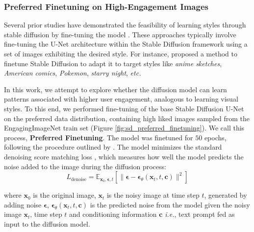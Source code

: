  

 
 
 \subsubsection{Preferred Finetuning on High-Engagement Images}
 \label{sec:Finetuning Stable Diffusion on High-KPI Images}
 
 Several prior studies have demonstrated the feasibility of learning styles through stable diffusion by fine-tuning the model \cite{pinkney2022text-to-pokemon,cjwbw2022waifudiffusion,prompthero2023openjourneyv2,everaert2023diffusion}. These approaches typically involve fine-tuning the U-Net architecture within the Stable Diffusion framework using a set of images exhibiting the desired style.
 For instance, \citet{everaert2023diffusion} proposed a method to finetune Stable Diffusion to adapt it to target styles like \textit{anime sketches}, \textit{American comics}, \textit{Pokemon}, \textit{starry night}, \textit{etc.}
 
 In this work, we attempt to explore whether the diffusion model can learn patterns associated with higher user engagement, analogous to learning visual styles. To this end, we performed fine-tuning of the base Stable Diffusion U-Net on the preferred data distribution, containing high liked images sampled from the EngagingImageNet train set (Figure \ref{fig:sd_preferred_finetuning}). We call this process, \textbf{Preferred Finetuning}. The model was finetuned for $50$ epochs, following the procedure outlined by \citet{vonplaten2023stablediffusion}. The model minimizes the standard denoising score matching loss \cite{ho2020denoising, ho2022classifier}, which measures how well the model predicts the noise added to the image during the diffusion process:
\begin{equation}
    L_{\text{denoise}} = \mathbb{E}_{\mathbf{x}_0, \boldsymbol{\epsilon}, t} \left[ \|\boldsymbol{\epsilon} - \boldsymbol{\epsilon}_{\theta}(\mathbf{x}_t, t, \mathbf{c})\|^2 \right]
\end{equation}


where $\mathbf{x}_0$ is the original image, $\mathbf{x}_t$ is the noisy image at time step $t$, generated by adding noise $\boldsymbol{\epsilon}$, $\boldsymbol{\epsilon}_{\theta}(\mathbf{x}_t, t, \mathbf{c})$ is the predicted noise from the model given the noisy image $\mathbf{x}_t$, time step $t$ and conditioning information $\mathbf{c}$ \textit{i.e.}, text prompt fed as input to the diffusion model. 




